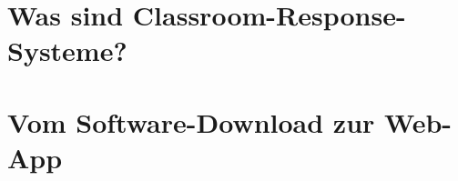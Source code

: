 %
\section{Was sind Classroom-Response-Systeme?}
\label{chap:motivation}

%
\section{Vom Software-Download zur Web-App}
\label{chap:motivation}

%